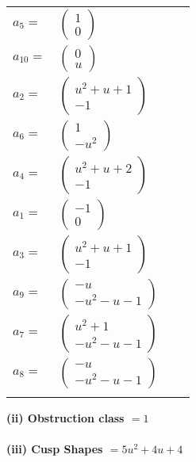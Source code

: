 \documentclass[1p]{elsarticle_modified}
\theoremstyle{definition}
\begin{document}
\begin{tabular}{m{7pt} m{180pt} m{7pt} m{180pt} }
\flushright $a_{5}=$&$\begin{pmatrix}1\\0\end{pmatrix}$ \\
\flushright $a_{10}=$&$\begin{pmatrix}0\\u\end{pmatrix}$ \\
\flushright $a_{2}=$&$\begin{pmatrix}u^2+u+1\\-1\end{pmatrix}$ \\
\flushright $a_{6}=$&$\begin{pmatrix}1\\- u^2\end{pmatrix}$ \\
\flushright $a_{4}=$&$\begin{pmatrix}u^2+u+2\\-1\end{pmatrix}$ \\
\flushright $a_{1}=$&$\begin{pmatrix}-1\\0\end{pmatrix}$ \\
\flushright $a_{3}=$&$\begin{pmatrix}u^2+u+1\\-1\end{pmatrix}$ \\
\flushright $a_{9}=$&$\begin{pmatrix}- u\\- u^2- u-1\end{pmatrix}$ \\
\flushright $a_{7}=$&$\begin{pmatrix}u^2+1\\- u^2- u-1\end{pmatrix}$ \\
\flushright $a_{8}=$&$\begin{pmatrix}- u\\- u^2- u-1\end{pmatrix}$\\&\end{tabular}
\flushleft \textbf{(ii) Obstruction class $= 1$}\\~\\
\flushleft \textbf{(iii) Cusp Shapes $= 5 u^2+4 u+4$}\\~\\
\end{document}
